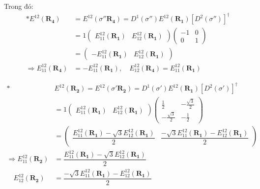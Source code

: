 \documentclass{article}
\begin{document}
Trong đó:
\begin{align*}
	\ast E^{12}(\mathbf{R_4})             & = E^{12}(\sigma''\mathbf{R_4}) = D^1(\sigma'') E^{12}(\mathbf{R_1}) \left[D^2(\sigma'')\right]^\dagger \\
	                                      & = 1
	\begin{pmatrix}
		E_{11}^{12}(\mathbf{R_1}) & E_{12}^{12}(\mathbf{R_1})
	\end{pmatrix}
	\begin{pmatrix}
		-1 & 0 \\
		0  & 1
	\end{pmatrix}                                                                                                                                 \\
	                                      & =
	\begin{pmatrix}
		- E_{11}^{12}(\mathbf{R_1}) & E_{12}^{12}(\mathbf{R_1})
	\end{pmatrix}                                                                                        \\
	\Rightarrow E_{11}^{12}(\mathbf{R_4}) & = - E_{11}^{12}(\mathbf{R_1}) , \quad E_{12}^{12}(\mathbf{R_4}) = E_{11}^{12}(\mathbf{R_1})
\end{align*}

\begin{align*}
	\ast                                  & E^{12}(\mathbf{R_2})             = E^{12}(\sigma'\mathbf{R_2}) = D^1(\sigma') E^{12}(\mathbf{R_1}) \left[D^2(\sigma')\right]^\dagger \\
	                                      & = 1
	\begin{pmatrix}
		E_{11}^{12}(\mathbf{R_1}) & E_{12}^{12}(\mathbf{R_1})
	\end{pmatrix}
	\begin{pmatrix}
		\frac{1}{2}         & -\frac{\sqrt{3}}{2} \\
		-\frac{\sqrt{3}}{2} & -\frac{1}{2}
	\end{pmatrix}                                                                                                                     \\
	                                      & =
	\begin{pmatrix}
		\dfrac{E_{11}^{12}(\mathbf{R_1}) - \sqrt{3}E_{12}^{12}(\mathbf{R_1})}{2} & \dfrac{ -\sqrt{3}E_{11}^{12}(\mathbf{R_1}) - E_{12}^{12}(\mathbf{R_1})}{2}
	\end{pmatrix}                        \\
	\Rightarrow E_{11}^{12}(\mathbf{R_2}) & = \dfrac{E_{11}^{12}(\mathbf{R_1}) - \sqrt{3}E_{12}^{12}(\mathbf{R_1})}{2}                                                           \\
	\quad E_{12}^{12}(\mathbf{R_2})       & = \dfrac{ -\sqrt{3}E_{11}^{12}(\mathbf{R_1}) - E_{12}^{12}(\mathbf{R_1})}{2}
\end{align*}
\end{document}
